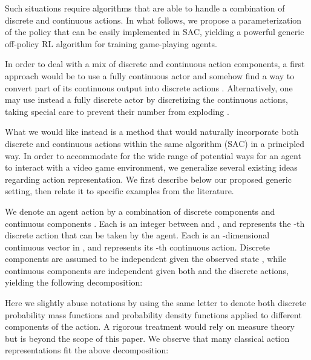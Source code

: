\documentclass[letterpaper]{article} \usepackage{aaai20}  \usepackage{times}  \usepackage{helvet} \usepackage{courier}  \usepackage[hyphens]{url}  \usepackage{graphicx} \urlstyle{rm} \def\UrlFont{\rm}  \usepackage{graphicx}  \usepackage[section]{placeins}
\begin{document}
Such situations require algorithms that are able to handle a combination of discrete and continuous actions.
In what follows, we propose a parameterization of the policy that can be easily implemented in SAC, yielding a powerful generic off-policy RL algorithm for training game-playing agents.



In order to deal with a mix of discrete and continuous action components, a first approach would be to use a fully continuous actor and somehow find a way to convert part of its continuous output into discrete actions \citep{vanhasselt2009,hausknecht2016,cianflone2019}.
Alternatively, one may use instead a fully discrete actor by discretizing the continuous actions, taking special care to prevent their number from exploding \citep{metz2017,andriotis2018,tang2019}.



What we would like instead is a method that would naturally incorporate both discrete and continuous actions within the same algorithm (SAC) in a principled way.
In order to accommodate for the wide range of potential ways for an agent to interact with a video game environment, we generalize several existing ideas regarding action representation.
We first describe below our proposed generic setting, then relate it to specific examples from the literature.

We denote an agent action  by a combination of discrete components  and continuous components . Each  is an integer between  and , and represents the -th discrete action that can be taken by the agent. Each  is an -dimensional continuous vector in , and represents its -th continuous action.
Discrete components are assumed to be independent given the observed state , while continuous components are independent given both  and the discrete actions, yielding the following decomposition:

Here we slightly abuse notations by using the same letter  to denote both discrete probability mass functions and probability density functions applied to different components of the action.
A rigorous treatment would rely on measure theory
but is beyond the scope of this paper.
We observe that many classical action representations fit the above decomposition:
\end{document}
